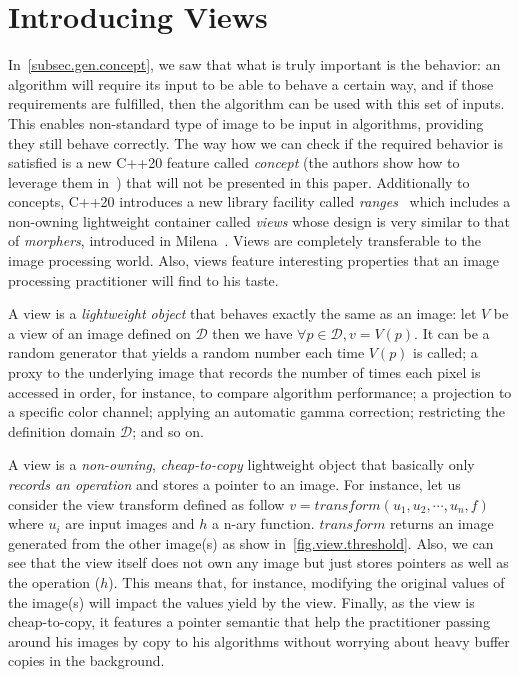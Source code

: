 \section{Introducing Views}
\label{sec.views}

In~\cref{subsec.gen.concept}, we saw that what is truly important is the behavior: an algorithm will require its input
to be able to behave a certain way, and if those requirements are fulfilled, then the algorithm can be used with this
set of inputs. This enables non-standard type of image to be input in algorithms, providing they still behave correctly.
The way how we can check if the required behavior is satisfied is a new C++20 feature called \emph{concept} (the authors
show how to leverage them in~\cite{roynard.2019.rrpr}) that will not be presented in this paper. Additionally to
concepts, C++20 introduces a new library facility called \emph{ranges}~\cite{niebler.2018.deepranges} which includes a
non-owning lightweight container called \emph{views} whose design is very similar to that of \emph{morphers}, introduced
in Milena~\cite{levillain.2009.ismm,geraud.2012.hdr}. Views are completely transferable to the image processing world.
Also, views feature interesting properties that an image processing practitioner will find to his taste.

A view is a \emph{lightweight object} that behaves exactly the same as an image: let $V$ be a view of an image defined
on $\mathcal{D}$ then we have $\forall{p}\in\mathcal{D}, v = V(p)$. It can be a random generator that yields a random
number each time $V(p)$ is called; a proxy to the underlying image that records the number of times each pixel is
accessed in order, for instance, to compare algorithm performance; a projection to a specific color channel; applying an
automatic gamma correction; restricting the definition domain $\mathcal{D}$; and so on.

A view is a \emph{non-owning}, \emph{cheap-to-copy} lightweight object that basically only \emph{records an operation}
and stores a pointer to an image. For instance, let us consider the view transform defined as follow $v = transform(u_1,
  u_2, \cdots, u_n, f)$ where $u_i$ are input images and $h$ a n-ary function. $transform$ returns an image generated from
the other image(s) as show in~\cref{fig.view.threshold}. Also, we can see that the view itself does not own any image
but just stores pointers as well as the operation ($h$). This means that, for instance, modifying the original values of
the image(s) will impact the values yield by the view. Finally, as the view is cheap-to-copy, it features a pointer
semantic that help the practitioner passing around his images by copy to his algorithms without worrying about heavy
buffer copies in the background.

